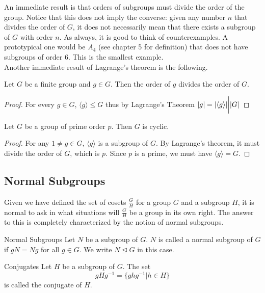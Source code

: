 \documentclass[a4paper]{article}
\begin{document}
An immediate result is that orders of subgroups must divide the order of the group. Notice that this does not imply the converse: given any number $n$ that divides the order of $G$, it does not necessarily mean that there exists a subgroup of $G$ with order $n$. As always, it is good to think of counterexamples. A prototypical one would be $A_4$ (see chapter 5 for definition) that does not have subgroups of order $6$. This is the smallest example. \\

Another immediate result of Lagrange's theorem is the following. 

\begin{crl}{}{} Let $G$ be a finite group and $g\in G$. Then the order of $g$ divides the order of $G$. 
\begin{proof} For every $g\in G$, $\langle g\rangle\leq G$ thus by Lagrange's Theorem $\abs{g}=\abs{\langle g\rangle}\bigg{|}\abs{G}$
\end{proof}
\end{crl}

\begin{crl}{}{} Let $G$ be a group of prime order $p$. Then $G$ is cyclic. 
\begin{proof}
For any $1\neq g\in G$, $\langle g\rangle$ is a subgroup of $G$. By Lagrange's theorem, it must divide the order of $G$, which is $p$. Since $p$ is a prime, we must have $\langle g\rangle=G$. 
\end{proof}
\end{crl}

\subsection{Normal Subgroups}
Given we have defined the set of cosets $\frac{G}{H}$ for a group $G$ and a subgroup $H$, it is normal to ask in what situations will $\frac{G}{H}$ be a group in its own right. The answer to this is completely characterized by the notion of normal subgroups. 

\begin{defn}{Normal Subgroups}{} Let $N$ be a subgroup of $G$. $N$ is called a normal subgroup of $G$ if $gN=Ng$ for all $g\in G$. We write $N\trianglelefteq G$ in this case. 
\end{defn}

\begin{defn}{Conjugates}{} Let $H$ be a subgroup of $G$. The set $$gHg^{-1}=\{ghg^{-1}|h\in H\}$$ is called the conjugate of $H$. 
\end{defn}
\end{document}
